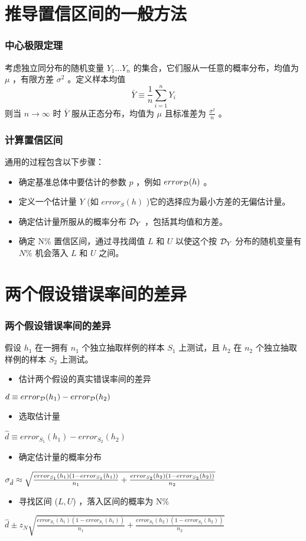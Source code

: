 \documentclass{beamer}
\begin{document}
\section{推导置信区间的一般方法}
\label{sec-4}
\begin{frame}
\frametitle{中心极限定理}
\label{sec-4-1}


考虑独立同分布的随机变量 $Y_{1} \ldots Y_{n}$ 的集合，它们服从一任意的概率分布，均值为 $\mu$ ，有限方差 $\sigma^{2}$ 。定义样本均值
\[\bar{Y}\equiv\frac{1}{n}\sum_{i=1}^{n}Y_{i} \]  
则当 $n \rightarrow \infty$ 时
$\bar{Y}$ 服从正态分布，均值为 $\mu$ 且标准差为 $\frac{\sigma^{2}}{n}$ 。
\end{frame}
\begin{frame}
\frametitle{计算置信区间}
\label{sec-4-2}


通用的过程包含以下步骤：
\begin{itemize}
\item 确定基准总体中要估计的参数 $p$ ，例如 $error_{\cal D}(h)$ 。
\item 定义一个估计量 $Y$ (如 $error_S(h)$ )它的选择应为最小方差的无偏估计量。
\item 确定估计量所服从的概率分布 ${\cal D}_Y$ ，包括其均值和方差。
\item 确定 N\% 置信区间，通过寻找阈值 $L$ 和 $U$ 以使这个按 ${\cal D}_Y$ 分布的随机变量有 $N\%$ 机会落入 $L$ 和 $U$ 之间。
\end{itemize}
\end{frame}
\section{两个假设错误率间的差异}
\label{sec-5}
\begin{frame}
\frametitle{两个假设错误率间的差异}
\label{sec-5-1}

假设 $h_{1}$ 在一拥有 $n_1$ 个独立抽取样例的样本 $S_1$ 上测试，且 $h_2$ 在 $n_2$ 个独立抽取样例的样本 $S_2$ 上测试。

\begin{itemize}
\item 估计两个假设的真实错误率间的差异
\end{itemize}
$d \equiv error_{\cal{D}}(h_{1}) - error_{\cal{D}}(h_{2})$
\begin{itemize}
\item 选取估计量
\end{itemize}
$\hat{d} \equiv error_{S_{1}}(h_{1}) - error_{S_{2}}(h_{2})$

\begin{itemize}
\item 确定估计量的概率分布
\end{itemize}
$\small \sigma_{\hat{d}} \approx \sqrt{\frac{error_{S_{1}}(h_{1})(1 - error_{S_{1}}(h_{1}))}{n_{1}} + \frac{error_{S_{2}}(h_{2})(1 - error_{S_{2}}(h_{2}))}{n_{2}}}$
\begin{itemize}
\item 寻找区间 ($L, U$) ，落入区间的概率为 N\%
\end{itemize}
$\hat{d} \pm z_{N} \sqrt{\frac{error_{S_{1}}(h_{1})(1 -
error_{S_{1}}(h_{1}))}{n_{1}} + \frac{error_{S_{2}}(h_{2})(1 -
error_{S_{2}}(h_{2}))}{n_{2}} }$
\end{frame}
\end{document}
